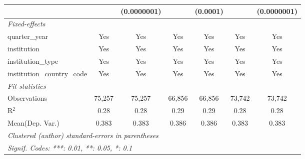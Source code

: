 \begin{tabular}{lcccccc}
                                      &               & (0.0000001)   &               & (0.0001)      &               & (0.0000001)\\   
   \midrule
   \emph{Fixed-effects}\\
   quarter\_year                      & Yes           & Yes           & Yes           & Yes           & Yes           & Yes\\  
   institution                        & Yes           & Yes           & Yes           & Yes           & Yes           & Yes\\  
   institution\_type                  & Yes           & Yes           & Yes           & Yes           & Yes           & Yes\\  
   institution\_country\_code         & Yes           & Yes           & Yes           & Yes           & Yes           & Yes\\  
   \midrule
   \emph{Fit statistics}\\
   Observations                       & 75,257        & 75,257        & 66,856        & 66,856        & 73,742        & 73,742\\  
   R$^2$                              & 0.28          & 0.28          & 0.29          & 0.29          & 0.28          & 0.28\\  
Mean(Dep. Var.) & 0.383 & 0.383 & 0.386 & 0.386 & 0.383 & 0.383 \\
   \midrule \midrule
   \multicolumn{7}{l}{\emph{Clustered (author) standard-errors in parentheses}}\\
   \multicolumn{7}{l}{\emph{Signif. Codes: ***: 0.01, **: 0.05, *: 0.1}}\\
\end{tabular}
\par\endgroup

